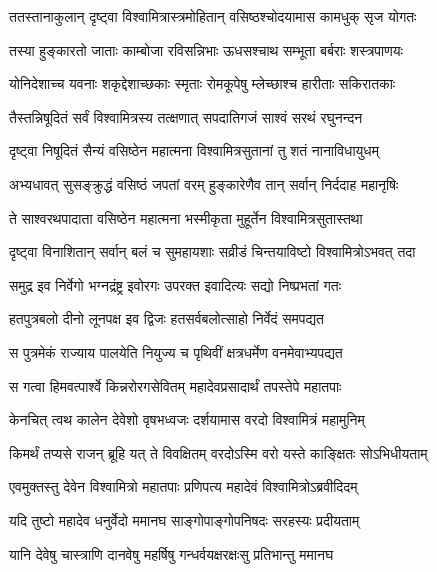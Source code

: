 
\twolineshloka
{ततस्तानाकुलान् दृष्ट्वा विश्वामित्रास्त्रमोहितान्}
{वसिष्ठश्चोदयामास कामधुक् सृज योगतः} %

\twolineshloka
{तस्या हुङ्कारतो जाताः काम्बोजा रविसन्निभाः}
{ऊधसश्चाथ सम्भूता बर्बराः शस्त्रपाणयः} %

\twolineshloka
{योनिदेशाच्च यवनाः शकृद्देशाच्छकाः स्मृताः}
{रोमकूपेषु म्लेच्छाश्च हारीताः सकिरातकाः} %

\twolineshloka
{तैस्तन्निषूदितं सर्वं विश्वामित्रस्य तत्क्षणात्}
{सपदातिगजं साश्वं सरथं रघुनन्दन} %

\twolineshloka
{दृष्ट्वा निषूदितं सैन्यं वसिष्ठेन महात्मना}
{विश्वामित्रसुतानां तु शतं नानाविधायुधम्} %

\twolineshloka
{अभ्यधावत् सुसङ्क्रुद्धं वसिष्ठं जपतां वरम्}
{हुङ्कारेणैव तान् सर्वान् निर्ददाह महानृषिः} %

\twolineshloka
{ते साश्वरथपादाता वसिष्ठेन महात्मना}
{भस्मीकृता मुहूर्तेन विश्वामित्रसुतास्तथा} %

\twolineshloka
{दृष्ट्वा विनाशितान् सर्वान् बलं च सुमहायशाः}
{सव्रीडं चिन्तयाविष्टो विश्वामित्रोऽभवत् तदा} %

\twolineshloka
{समुद्र इव निर्वेगो भग्नद्रंष्ट्र इवोरगः}
{उपरक्त इवादित्यः सद्यो निष्प्रभतां गतः} %

\twolineshloka
{हतपुत्रबलो दीनो लूनपक्ष इव द्विजः}
{हतसर्वबलोत्साहो निर्वेदं समपद्यत} %

\twolineshloka
{स पुत्रमेकं राज्याय पालयेति नियुज्य च}
{पृथिवीं क्षत्रधर्मेण वनमेवाभ्यपद्यत} %

\twolineshloka
{स गत्वा हिमवत्पार्श्वे किन्नरोरगसेवितम्}
{महादेवप्रसादार्थं तपस्तेपे महातपाः} %

\twolineshloka
{केनचित् त्वथ कालेन देवेशो वृषभध्वजः}
{दर्शयामास वरदो विश्वामित्रं महामुनिम्} %

\twolineshloka
{किमर्थं तप्यसे राजन् ब्रूहि यत् ते विवक्षितम्}
{वरदोऽस्मि वरो यस्ते काङ्क्षितः सोऽभिधीयताम्} %

\twolineshloka
{एवमुक्तस्तु देवेन विश्वामित्रो महातपाः}
{प्रणिपत्य महादेवं विश्वामित्रोऽब्रवीदिदम्} %

\twolineshloka
{यदि तुष्टो महादेव धनुर्वेदो ममानघ}
{साङ्गोपाङ्गोपनिषदः सरहस्यः प्रदीयताम्} %

\twolineshloka
{यानि देवेषु चास्त्राणि दानवेषु महर्षिषु}
{गन्धर्वयक्षरक्षःसु प्रतिभान्तु ममानघ} %

